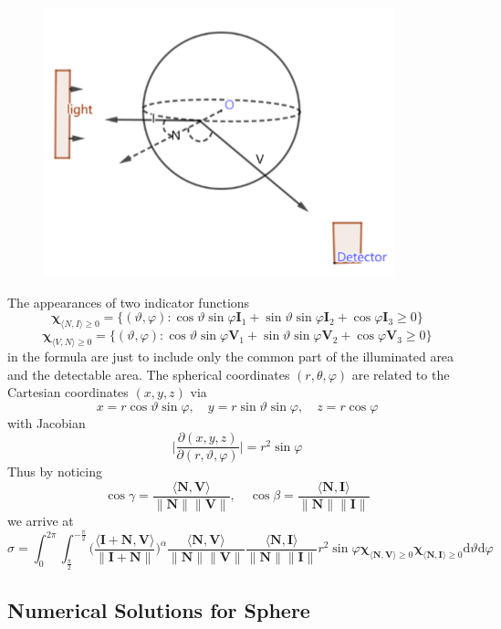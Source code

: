 \documentclass[11pt]{amsart}
\newcommand{\ip}[2]{\langle {#1}, {#2} \rangle}
\theoremstyle{definition}
\begin{document}
\begin{figure}[h!]
  \includegraphics[width=4in]{./figs/Sphere_edit.pdf}
  \label{fig:sphere}
\end{figure}
The appearances of two indicator functions 
$$\mathbf{\chi}_{\ip{N}{I}\geq 0}=\{(\vartheta,\varphi):\cos\vartheta\sin\varphi\mathbf{I}_1+\sin\vartheta\sin\varphi\mathbf{I}_2+\cos\varphi\mathbf{I}_3\geq 0\}$$ 
$$\mathbf{\chi}_{\ip{V}{N}\geq 0}=\{(\vartheta,\varphi): \cos\vartheta\sin\varphi\mathbf{V}_1+\sin\vartheta\sin\varphi\mathbf{V}_2+\cos\varphi\mathbf{V}_3\geq 0\}$$ 
in the formula are just to include only the common part of the illuminated area and the detectable area.
The spherical coordinates $(r,\theta,\varphi)$ are related to the Cartesian coordinates $(x,y,z)$ via
$$x =r\cos\vartheta \sin\varphi, \quad y=r\sin\vartheta \sin\varphi, \quad z=r\cos\varphi $$
with Jacobian 
$$\bigg|\frac{\partial(x,y,z)}{\partial(r,\vartheta,\varphi)}\bigg|= r^2 \sin\varphi $$
Thus by noticing 
$$\cos\gamma =\frac{\ip{\mathbf{N}}{\mathbf{V}}}{\|\mathbf{N}\| \|\mathbf{V}\|},\quad \cos\beta=\frac{\ip{\mathbf{N}}{\mathbf{I}}}{\|\mathbf{N}\| \|\mathbf{I}\|}$$
we arrive at
  $$\sigma =\int_{0}^{2\pi}\int_{\frac{\pi}{2}}^{-\frac{\pi}{2}}\Bigg(\frac{\ip{\mathbf{I}+\mathbf{N}}{\mathbf{V}}}{\|\mathbf{I}+\mathbf{N}\|}\Bigg)^\alpha\frac{\ip{\mathbf{N}}{\mathbf{V}}}{\|\mathbf{N}\| \|\mathbf{V}\|}\frac{\ip{\mathbf{N}}{\mathbf{I}}}{\|\mathbf{N}\| \|\mathbf{I}\|}r^2\sin\varphi\mathbf{\chi}_{\ip{\mathbf{N}}{\mathbf{V}}\geq 0}\mathbf{\chi}_{\ip{\mathbf{N}}{\mathbf{I}}\geq 0}\mathrm{d}\vartheta\mathrm{d}\varphi$$
  
\subsection{Numerical Solutions for Sphere}
\end{document}
